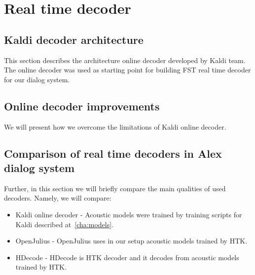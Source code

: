 \chapter{Real time decoder}
\label{cha:decoder}



\section{Kaldi decoder architecture} 
\label{sec:kaldi_decoder_architecture}
This section describes the architecture online decoder developed by Kaldi team.
The online decoder was used as starting point for building FST real time decoder for our dialog system.


\section{Online decoder improvements} 
\label{sec:online_decoder_improvements}
We will present how we overcome the limitations of Kaldi online decoder.



\section{Comparison of real time decoders in Alex dialog system} 
\label{sec:comparison_of_real_time_decoders_in_alex_dialog_system}
Further, in this section we will briefly compare the main qualities of used decoders.
Namely, we will compare: 
\begin{itemize}
    \item Kaldi online decoder - Acoustic models were trained by training scripts for Kaldi described at~\ref{cha:models}.
    \item OpenJulius - OpenJulius uses in our setup acoustic models trained by HTK. 
    \item HDecode - HDecode is HTK decoder and it decodes from acoustic models trained by HTK.
\end{itemize}


